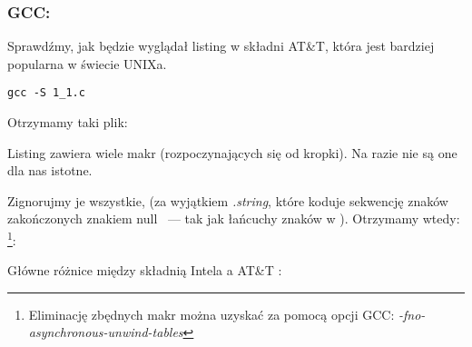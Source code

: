 \subsubsection{GCC: \ATTSyntax}
\label{ATT_syntax}

Sprawdźmy, jak będzie wyglądał listing w składni AT\&T, która jest bardziej popularna w świecie UNIXa.

\begin{lstlisting}[caption=Kompilujemy za pomocą GCC 4.7.3]
gcc -S 1_1.c
\end{lstlisting}

Otrzymamy taki plik:



Listing zawiera wiele makr (rozpoczynających się od kropki). Na razie nie są one dla nas istotne.

Zignorujmy je wszystkie, (za wyjątkiem \emph{.string}, które koduje sekwencję znaków zakończonych znakiem null ~--- tak jak łańcuchy znaków w \Cpp). Otrzymamy wtedy:
\footnote{Eliminację zbędnych makr można uzyskać za pomocą opcji GCC: \emph{-fno-asynchronous-unwind-tables}}:



\myindex{\ATTSyntax}
\myindex{\IntelSyntax}
Główne różnice między składnią Intela a AT\&T :

